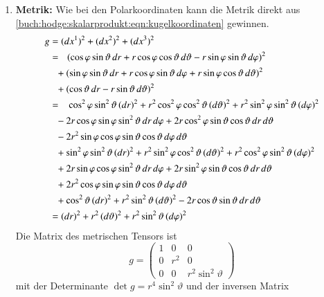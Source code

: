 \begin{enumerate}
\item {\bf Metrik:}
Wie bei den Polarkoordinaten kann die Metrik direkt aus 
\eqref{buch:hodge:skalarprodukt:eqn:kugelkoordinaten}
gewinnen.
\begin{align*}
g
&=
(dx^1)^2 + (dx^2)^2 + (dx^3)^2
\\
&=\phantom{+}
(
  \cos\varphi \sin\vartheta \,dr
+
r \cos\varphi \cos\vartheta \,d\vartheta
-
r \sin\varphi \sin\vartheta \,d\varphi
)^2
\\
&\phantom{=}\mathstrut+
(
  \sin\varphi \sin\vartheta \,dr
+
r \cos\varphi \sin\vartheta \,d\varphi
+
r \sin\varphi \cos\vartheta \,d\vartheta
)^2
\\
&\phantom{=}\mathstrut+
(
  \cos\vartheta \,dr
-
r \sin\vartheta \,d\vartheta
)^2
\\
&=\mathstrut\phantom{+}
\cos^2\varphi \sin^2\vartheta \, (dr)^2
+
r^2 \cos^2\varphi \cos^2\vartheta \, (d\vartheta)^2
+
r^2 \sin^2\varphi \sin^2\vartheta \, (d\varphi)^2
\\
&\phantom{=}\mathstrut-
2r \cos\varphi \sin\varphi \sin^2\vartheta \,dr\,d\varphi
+
2r \cos^2\varphi \sin\vartheta \cos\vartheta \,dr\,d\vartheta
\\
&\phantom{=}\mathstrut-
2r^2 \sin\varphi \cos\varphi \sin\vartheta \cos\vartheta \,d\varphi\,d\vartheta
\\
&\phantom{=}\mathstrut+
\sin^2\varphi\sin^2\vartheta \,(dr)^2
+
r^2\sin^2\varphi\cos^2\vartheta \,(d\vartheta)^2
+
r^2\cos^2\varphi\sin^2\vartheta \,(d\varphi)^2
\\
&\phantom{=}\mathstrut+
2r\sin\varphi\cos\varphi\sin^2\vartheta \,dr\,d\varphi
+
2r\sin^2\varphi\sin\vartheta\cos\vartheta \,dr\,d\vartheta
\\
&\phantom{=}\mathstrut+
2r^2\cos\varphi\sin\varphi\sin\vartheta\cos\vartheta \,d\varphi\,d\vartheta
\\
&\phantom{=}\mathstrut+
   \cos^2\vartheta \,(dr)^2
+
r^2 \sin^2\vartheta \,(d\vartheta)^2
-
2r \cos\vartheta \sin\vartheta \,dr\,d\vartheta
\\
&=
(dr)^2
+
r^2\, (d\vartheta)^2
+
r^2\sin^2\vartheta\,(d\varphi)^2
\end{align*}
Die Matrix des metrischen Tensors ist
\[
g
=
\begin{pmatrix}
1 &  0  &         0           \\
0 & r^2 &         0           \\
0 &  0  & r^2 \sin^2\vartheta
\end{pmatrix}
\]
mit der Determinante $\det g=r^4\sin^2\vartheta$ und der inversen Matrix

\end{enumerate}
